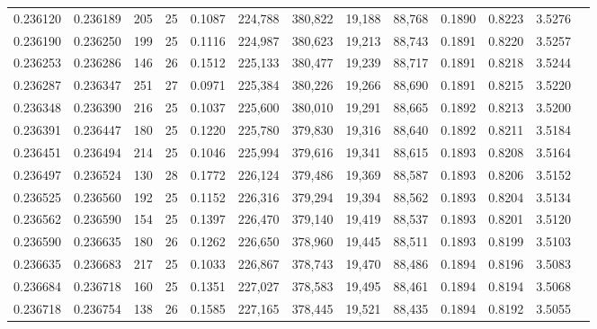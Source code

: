 \begin{tabular}{rrrrrrrrrrrrr}
0.236120 & 0.236189 &   205 &  25 &                                     0.1087 & 224,788 & 380,822 &  19,188 &  88,768 & 0.1890 & 0.8223 & 3.5276 \\
0.236190 & 0.236250 &   199 &  25 &                                     0.1116 & 224,987 & 380,623 &  19,213 &  88,743 & 0.1891 & 0.8220 & 3.5257 \\
0.236253 & 0.236286 &   146 &  26 &                                     0.1512 & 225,133 & 380,477 &  19,239 &  88,717 & 0.1891 & 0.8218 & 3.5244 \\
0.236287 & 0.236347 &   251 &  27 &                                     0.0971 & 225,384 & 380,226 &  19,266 &  88,690 & 0.1891 & 0.8215 & 3.5220 \\
0.236348 & 0.236390 &   216 &  25 &                                     0.1037 & 225,600 & 380,010 &  19,291 &  88,665 & 0.1892 & 0.8213 & 3.5200 \\
0.236391 & 0.236447 &   180 &  25 &                                     0.1220 & 225,780 & 379,830 &  19,316 &  88,640 & 0.1892 & 0.8211 & 3.5184 \\
0.236451 & 0.236494 &   214 &  25 &                                     0.1046 & 225,994 & 379,616 &  19,341 &  88,615 & 0.1893 & 0.8208 & 3.5164 \\
0.236497 & 0.236524 &   130 &  28 &                                     0.1772 & 226,124 & 379,486 &  19,369 &  88,587 & 0.1893 & 0.8206 & 3.5152 \\
0.236525 & 0.236560 &   192 &  25 &                                     0.1152 & 226,316 & 379,294 &  19,394 &  88,562 & 0.1893 & 0.8204 & 3.5134 \\
0.236562 & 0.236590 &   154 &  25 &                                     0.1397 & 226,470 & 379,140 &  19,419 &  88,537 & 0.1893 & 0.8201 & 3.5120 \\
0.236590 & 0.236635 &   180 &  26 &                                     0.1262 & 226,650 & 378,960 &  19,445 &  88,511 & 0.1893 & 0.8199 & 3.5103 \\
0.236635 & 0.236683 &   217 &  25 &                                     0.1033 & 226,867 & 378,743 &  19,470 &  88,486 & 0.1894 & 0.8196 & 3.5083 \\
0.236684 & 0.236718 &   160 &  25 &                                     0.1351 & 227,027 & 378,583 &  19,495 &  88,461 & 0.1894 & 0.8194 & 3.5068 \\
0.236718 & 0.236754 &   138 &  26 &                                     0.1585 & 227,165 & 378,445 &  19,521 &  88,435 & 0.1894 & 0.8192 & 3.5055 \\

\end{tabular}
